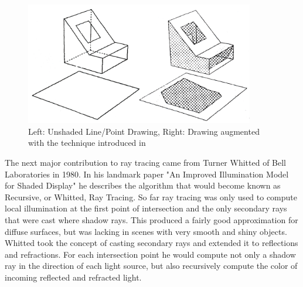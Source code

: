 \documentclass{ACGSeminar}
\begin{document}
\begin{figure}[htb!]
  \begin{centering}
    \includegraphics[width=10cm]{figures/Appel_Shading.png}\par
  \end{centering}
  \caption{Left: Unshaded Line/Point Drawing, Right: Drawing augmented with the technique introduced in \cite{Appel68}}
  \label{fig:appel_tracing}
\end{figure}

The next major contribution to ray tracing came from Turner Whitted of Bell Laboratories in 1980. In his landmark paper "An Improved Illumination Model for Shaded Display" \cite{Whitted:1980} he describes the algorithm that would become known as Recursive, or Whitted, Ray Tracing. So far ray tracing was only used to compute local illumination at the first point of intersection and the only secondary rays that were cast where shadow rays. This produced a fairly good approximation for diffuse surfaces, but was lacking in scenes with very smooth and shiny objects. Whitted took the concept of casting secondary rays and extended it to reflections and refractions. For each intersection point he would compute not only a shadow ray in the direction of each light source, but also recursively compute the color of incoming reflected and refracted light. 

\begin{center}
\end{center}
\end{document}
